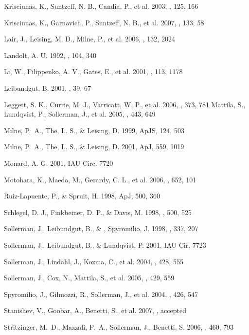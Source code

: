 \documentclass{aa}
\begin{document}
\begin{thebibliography}{}
Krisciunas, K., Suntzeff, N. B., Candia, P., et al. 2003, \aj, 125, 166

Krisciunas, K., Garnavich, P., Suntzeff, N. B., et al. 2007, \aj, 133, 58

Lair, J., Leising, M. D., Milne, P., et al. 2006, \aj, 132, 2024

Landolt, A. U. 1992, \aj, 104, 340

Li, W., Filippenko, A. V., Gates, E., et al. 2001, \pasp, 113, 1178

Leibundgut, B. 2001, \aapr, 39, 67

Leggett, S. K., Currie, M. J., Varricatt, W. P., et al. 2006, \mnras, 373, 781
Mattila,  S., Lundqvist, P., Sollerman, J., et al. 2005, \aap, 443, 649

Milne, P.~A., The, L. S., \& Leising, D. 1999, ApJS, 124, 503

Milne, P.~A., The, L. S., \& Leising, D. 2001, ApJ, 559, 1019

Monard, A. G. 2001, IAU Circ. 7720

Motohara, K., Maeda, M., Gerardy, C. L., et al. 2006, \apjl, 652, 101 

Ruiz-Lapuente, P., \& Spruit, H. 1998, ApJ, 500, 360

Schlegel, D. J., Finkbeiner, D. P., \& Davis, M. 1998, \apj, 500, 525

Sollerman, J., Leibundgut, B., \& , Spyromilio, J. 1998, \aap, 337, 207

Sollerman, J., Leibundgut, B., \& Lundqvist, P. 2001, IAU Cir. 7723 

Sollerman, J., Lindahl, J., Kozma, C., et al. 2004, \aap, 428, 555

Sollerman, J., Cox, N., Mattila, S., et al. 2005, \aap, 429, 559

Spyromilio, J., Gilmozzi, R., Sollerman, J., et al. 2004, \aap, 426, 547

Stanishev, V., Goobar, A., Benetti, S., et al. 2007, \aap, accepted

Stritzinger, M.~D., Mazzali, P.~A., Sollerman, J., Benetti, S. 2006, \aap,
460, 793


\end{thebibliography}
\end{document}
